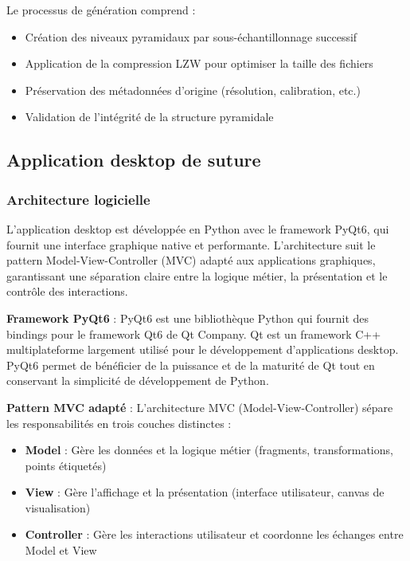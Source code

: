 \documentclass[12pt,a4paper]{report}
\begin{document}
Le processus de génération comprend :
\begin{itemize}
\item Création des niveaux pyramidaux par sous-échantillonnage successif
\item Application de la compression LZW pour optimiser la taille des fichiers
\item Préservation des métadonnées d'origine (résolution, calibration, etc.)
\item Validation de l'intégrité de la structure pyramidale
\end{itemize}

\subsection{Application desktop de suture}

\subsubsection{Architecture logicielle}

L'application desktop est développée en Python avec le framework PyQt6, qui fournit une interface graphique native et performante. L'architecture suit le pattern Model-View-Controller (MVC) adapté aux applications graphiques, garantissant une séparation claire entre la logique métier, la présentation et le contrôle des interactions.

\textbf{Framework PyQt6} : PyQt6 est une bibliothèque Python qui fournit des bindings pour le framework Qt6 de Qt Company. Qt est un framework C++ multiplateforme largement utilisé pour le développement d'applications desktop. PyQt6 permet de bénéficier de la puissance et de la maturité de Qt tout en conservant la simplicité de développement de Python.

\textbf{Pattern MVC adapté} : L'architecture MVC (Model-View-Controller) sépare les responsabilités en trois couches distinctes :
\begin{itemize}
\item \textbf{Model} : Gère les données et la logique métier (fragments, transformations, points étiquetés)
\item \textbf{View} : Gère l'affichage et la présentation (interface utilisateur, canvas de visualisation)
\item \textbf{Controller} : Gère les interactions utilisateur et coordonne les échanges entre Model et View
\end{itemize}
\end{document}
